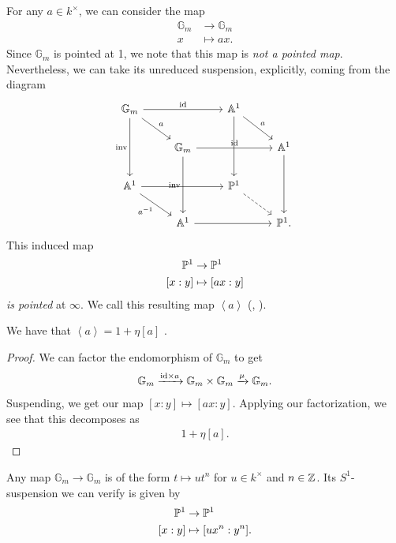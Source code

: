 \documentclass[11pt,openany]{book}
\begin{document}
For any $a\in k^\times$, we can consider the map
\begin{align*}
    \mathbb{G}_m &\to \mathbb{G}_m \\
    x &\mapsto ax.
\end{align*}
Since $\mathbb{G}_m$ is pointed at 1, we note that this map is \textit{not a pointed map}. Nevertheless, we can take its unreduced suspension, explicitly, coming from the diagram
\[\begin{tikzcd}
    \mathbb{G}_m\ar[dr,"a"]\ar[rr,"\id"]\ar[dd,"\inv" left] &  & \A^1\ar[dr,"a" above right]\ar[dd] & \\
     & \mathbb{G}_m\ar[dd,"\inv" left]\ar[rr,"\id"] &  & \A^1\ar[dd]\\
    \A^1\ar[dr,"a^{-1}" below left]\ar[rr] &  & \P^1\ar[dr,dashed] & \\
     & \A^1\ar[rr] &  & \P^1.
\end{tikzcd} \]
This induced map
\begin{align*}
    \P^1 &\to \P^1 \\
    [x:y] &\mapsto [ax:y]
\end{align*}
\textit{is pointed} at $\infty$. We call this resulting map $\left\langle a \right\rangle$ (\cite[6.3.4]{Trieste}, \cite[p.~74]{Morel}).




\begin{lemma}\label{lem:bracket-a-stable-htpy}
We have that $\left\langle a \right\rangle = 1 + \eta[a]$ \cite[3.43(1)]{Morel}.
\end{lemma}
\begin{proof} We can factor the endomorphism of $\mathbb{G}_m$ to get
\begin{align*}
    \mathbb{G}_m \xto{\id \times a} \mathbb{G}_m \times \mathbb{G}_m \xto{\mu} \mathbb{G}_m.
\end{align*}
Suspending, we get our map $[x:y] \mapsto [ax:y]$. Applying our factorization, we see that this decomposes as
\begin{align*}
    1 + \eta[a].
\end{align*}
\end{proof}

\begin{remark} Any map $\mathbb{G}_m \to \mathbb{G}_m$ is of the form $t \mapsto ut^n$ for $u\in k^\times$ and $n\in \Z$. Its $S^1$-suspension we can verify is given by
\begin{align*}
    \P^1 &\to \P^1 \\
    [x:y] &\mapsto [ux^n : y^n].
\end{align*}
\end{remark}
\end{document}
